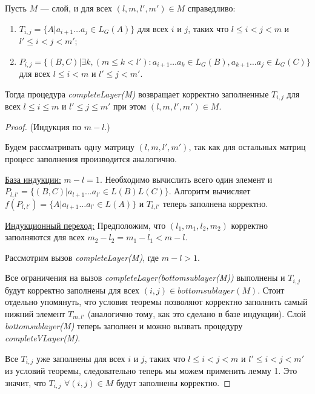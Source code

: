 \begin{theorem}
Пусть $M$ --- слой, и для всех $(l, m, l', m') \in M$ справедливо:
\begin{enumerate}
  \item $T_{i, j} = \{ A |  a_{i + 1} \dots a_{j} \in L_G(A)\}$ для всех $i$ и $j$, таких что $l \leq i < j < m$ и $l' \leq i < j < m'$;
  \item $P_{i, j} =  \{ (B, C) |\exists k, (m \le k < l'): a_{i + 1} \dots a_{k} \in L_G(B), a_{k + 1} \dots a_{j} \in L_G(C)\}$ для всех $l \leq i < m$ и $l' \leq j < m'$.
\end{enumerate}

Тогда процедура \textit{completeLayer(M)} возвращает корректно заполненные $T_{i, j}$ для всех $l \leq i \le m$ и $l' \leq j \le m'$ при этом $(l, m, l', m') \in M$.
\end{theorem}


\begin{proof}(Индукция по $m - l$.)

Будем рассматривать одну матрицу $(l, m, l', m')$, так как для остальных матриц процесс заполнения производится аналогично.

\underline{База индукции:} $m - l = 1$. Необходимо вычислить всего один элемент и $P_{l, l'} =  \{ (B, C) |  a_{l + 1} \dots a_{l'} \in L(B)L(C)\}$. Алгоритм вычисляет $f(P_{l, l'}) = \{ A |  a_{l + 1} \dots a_{l'} \in L(A)\}$ и $T_{l, l'}$ теперь заполнена корректно.

\underline{Индукционный переход:} Предположим, что $(l_1, m_1, l_2, m_2)$ корректно заполняются для всех $m_2 - l_2 = m_1 - l_1 < m - l$.

Рассмотрим вызов \textit{completeLayer(M)}, где $m - l > 1$.

Все ограничения на вызов \textit{completeLayer(bottomsublayer(M))} выполнены и $T_{i, j}$ будут корректно заполнены для всех $(i, j) \in bottomsublayer(M)$. Стоит отдельно упомянуть, что условия теоремы позволяют корректно заполнить самый нижний элемент $T_{m, l'}$ (аналогично тому, как это сделано в базе индукции).
Слой \textit{bottomsublayer(M)} теперь заполнен и можно вызвать процедуру \textit{completeVLayer(M)}.

Все $T_{i,j}$ уже заполнены для всех $i$ и $j$, таких что $l \leq i < j < m$ и $l' \leq i < j < m'$ из условий теоремы, следовательно теперь мы можем применить лемму 1. Это значит, что $T_{i, j}$ $\forall (i, j) \in M$ будут заполнены корректно.
\end{proof}

